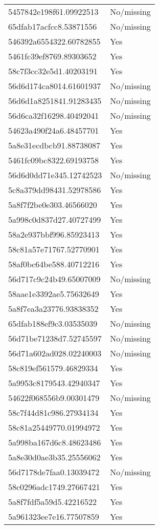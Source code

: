 \begin{tabular}{ll}
5457842e198f61.09922513 & No/missing \\
65dfab17acfcc8.53871556 & No/missing \\
546392a6554322.60782855 & Yes \\
5461fc39ef8769.89303652 & Yes \\
58c7f3cc32e5d1.40203191 & Yes \\
56d6d174ca8014.61601937 & No/missing \\
56d6d1a8251841.91283435 & No/missing \\
56d6ca32f16298.40492041 & No/missing \\
54623a490f24a6.48457701 & Yes \\
5a8e31ecdbcb91.88738087 & Yes \\
5461fc09bc8322.69193758 & Yes \\
56d6d0dd71e345.12742523 & No/missing \\
5c8a379dd98431.52978586 & Yes \\
5a8f7f2be0e303.46566020 & Yes \\
5a998c0d837d27.40727499 & Yes \\
58a2e937bbf996.85923413 & Yes \\
58c81a57e71767.52770901 & Yes \\
58af0bc64be588.40712216 & Yes \\
56d717c9c24b49.65007009 & No/missing \\
58aae1e3392ae5.75632649 & Yes \\
5a8f7ea3a23776.93838352 & Yes \\
65dfab188ef9c3.03535039 & No/missing \\
56d71be71238d7.52745597 & No/missing \\
56d71a602ad028.02240003 & No/missing \\
58c819ef561579.46829334 & Yes \\
5a9953c8179543.42940347 & Yes \\
54622f068556b9.00301479 & No/missing \\
58c7f44d81c986.27934134 & Yes \\
58c81a25449770.01994972 & Yes \\
5a998ba167d6c8.48623486 & Yes \\
5a8e30d0ae3b35.25556062 & Yes \\
56d7178de7faa0.13039472 & No/missing \\
58c0296adc1749.27667421 & Yes \\
5a8f7fdf5a59d5.42216522 & Yes \\
5a961323ee7e16.77507859 & Yes \\

\end{tabular}
